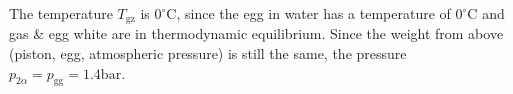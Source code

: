 The temperature \( T_{\text{gz}} \) is \( 0^\circ \text{C} \), since the egg in water has a temperature of \( 0^\circ \text{C} \) and gas & egg white are in thermodynamic equilibrium. Since the weight from above (piston, egg, atmospheric pressure) is still the same, the pressure \( p_{2\alpha} = p_{\text{gg}} = 1.4 \text{bar} \).